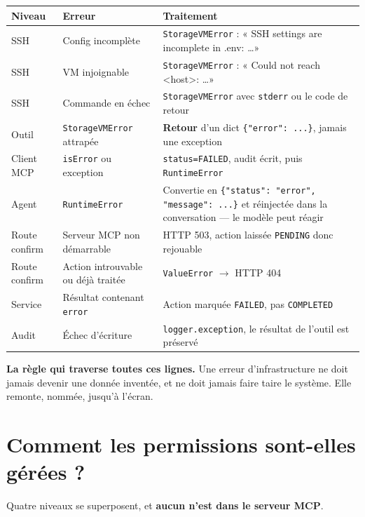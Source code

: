 \documentclass[11pt,a4paper]{report}
\newcommand{\fn}[1]{\texttt{\small\textcolor{oasisviolet}{#1}}}
\newcommand{\cls}[1]{\texttt{\small\textcolor{oasisblue}{#1}}}
\newcommand{\arrowto}{\ensuremath{\rightarrow}}
\begin{document}
\begin{longtable}{@{}p{3.5cm}p{4.2cm}p{6.9cm}@{}}
\toprule
\textbf{Niveau} & \textbf{Erreur} & \textbf{Traitement}\\
\midrule
\endhead
SSH & Config incomplète & \cls{StorageVMError} : « SSH settings are incomplete in .env: \ldots »\\
SSH & VM injoignable & \cls{StorageVMError} : « Could not reach <host>: \ldots »\\
SSH & Commande en échec & \cls{StorageVMError} avec \texttt{stderr} ou le code de retour\\
Outil & \cls{StorageVMError} attrapée & \textbf{Retour} d'un dict \texttt{\{"error": ...\}}, jamais une exception\\
Client MCP & \texttt{isError} ou exception & \texttt{status=FAILED}, audit écrit, puis \cls{RuntimeError}\\
Agent & \cls{RuntimeError} & Convertie en \texttt{\{"status": "error", "message": ...\}} et réinjectée dans la conversation --- le modèle peut réagir\\
Route confirm & Serveur MCP non démarrable & HTTP 503, action laissée \texttt{PENDING} donc rejouable\\
Route confirm & Action introuvable ou déjà traitée & \cls{ValueError} \arrowto{} HTTP 404\\
Service & Résultat contenant \texttt{error} & Action marquée \texttt{FAILED}, pas \texttt{COMPLETED}\\
Audit & Échec d'écriture & \fn{logger.exception}, le résultat de l'outil est préservé\\
\bottomrule
\end{longtable}

\begin{keybox}
\textbf{La règle qui traverse toutes ces lignes.} Une erreur d'infrastructure ne
doit jamais devenir une donnée inventée, et ne doit jamais faire taire le
système. Elle remonte, nommée, jusqu'à l'écran.
\end{keybox}

\section{Comment les permissions sont-elles gérées ?}

Quatre niveaux se superposent, et \textbf{aucun n'est dans le serveur MCP}.
\end{document}
